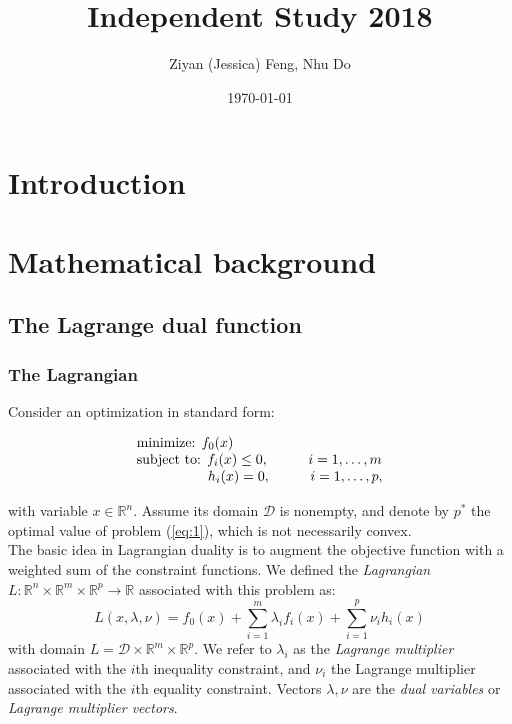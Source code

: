 \documentclass{article}
\title{Independent Study 2018}
\author{Ziyan (Jessica) Feng, Nhu Do}
\date{\today}
\newcommand{\R}{{\mathbb{R}}}
\begin{document}
\maketitle

\section{Introduction}

\section{Mathematical background}
\subsection{The Lagrange dual function}

\subsubsection{The Lagrangian}

Consider an optimization in standard form:

\begin{equation} \label{eq:1}
\begin{array}{l}
\textrm{minimize:	 }  f_0(x) \\
\textrm{subject to:  } 
f_i(x) \le 0, \hspace*{1cm} i = 1, \ldots, m \\
\hspace{1.8cm} h_i(x) = 0, \hspace*{1cm} i = 1, \ldots, p, 
\end{array}
\end{equation}

with variable $x \in \mathbb{R}^n$. Assume its domain $\mathcal{D}$ is nonempty, and denote by $p^*$ the optimal value of problem (\ref{eq:1}), which is not necessarily convex.\\

The basic idea in Lagrangian duality is to augment the objective function with a weighted sum of the constraint functions. We defined the \textit{Lagrangian} $L: \R^n \times \R^m \times \R^p \rightarrow \R$ associated with this problem as:
$$ L(x,\lambda,\nu) = f_0(x) + \sum_{i=1}^m \lambda_i f_i(x) + \sum_{i=1}^p \nu_i h_i(x) $$
with domain $L = \mathcal{D} \times \R^m \times \R^p$. We refer to $\lambda_i$ as the \textit{Lagrange multiplier} associated with the $i$th inequality constraint, and $\nu_i$ the Lagrange multiplier associated with the $i$th equality constraint. Vectors $\lambda, \nu$ are the \textit{dual variables} or \textit{Lagrange multiplier vectors}. 
\end{document}

